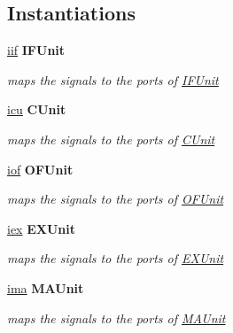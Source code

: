 \subsection*{Instantiations}
 \begin{DoxyCompactItemize}
\item 
\hypertarget{class_simple_r_i_s_c_1_1main_a6915378535caef0a1f9d2cf97dc464b7}{\hyperlink{class_simple_r_i_s_c_1_1main_a6915378535caef0a1f9d2cf97dc464b7}{iif}  {\bfseries I\-F\-Unit}   }\label{class_simple_r_i_s_c_1_1main_a6915378535caef0a1f9d2cf97dc464b7}

\begin{DoxyCompactList}\small\item\em maps the signals to the ports of \hyperlink{class_i_f_unit}{I\-F\-Unit} \end{DoxyCompactList}\item 
\hypertarget{class_simple_r_i_s_c_1_1main_ae66107dcb400a2c22d4d1316a2de3289}{\hyperlink{class_simple_r_i_s_c_1_1main_ae66107dcb400a2c22d4d1316a2de3289}{icu}  {\bfseries C\-Unit}   }\label{class_simple_r_i_s_c_1_1main_ae66107dcb400a2c22d4d1316a2de3289}

\begin{DoxyCompactList}\small\item\em maps the signals to the ports of \hyperlink{class_c_unit}{C\-Unit} \end{DoxyCompactList}\item 
\hypertarget{class_simple_r_i_s_c_1_1main_af2805cb31aa7733a71e2d9b7e59bb510}{\hyperlink{class_simple_r_i_s_c_1_1main_af2805cb31aa7733a71e2d9b7e59bb510}{iof}  {\bfseries O\-F\-Unit}   }\label{class_simple_r_i_s_c_1_1main_af2805cb31aa7733a71e2d9b7e59bb510}

\begin{DoxyCompactList}\small\item\em maps the signals to the ports of \hyperlink{class_o_f_unit}{O\-F\-Unit} \end{DoxyCompactList}\item 
\hypertarget{class_simple_r_i_s_c_1_1main_a03911597d8f737c88f243be080110a60}{\hyperlink{class_simple_r_i_s_c_1_1main_a03911597d8f737c88f243be080110a60}{iex}  {\bfseries E\-X\-Unit}   }\label{class_simple_r_i_s_c_1_1main_a03911597d8f737c88f243be080110a60}

\begin{DoxyCompactList}\small\item\em maps the signals to the ports of \hyperlink{class_e_x_unit}{E\-X\-Unit} \end{DoxyCompactList}\item 
\hypertarget{class_simple_r_i_s_c_1_1main_a35c82dc98430213354cf872354a1ca6b}{\hyperlink{class_simple_r_i_s_c_1_1main_a35c82dc98430213354cf872354a1ca6b}{ima}  {\bfseries M\-A\-Unit}   }\label{class_simple_r_i_s_c_1_1main_a35c82dc98430213354cf872354a1ca6b}

\begin{DoxyCompactList}\small\item\em maps the signals to the ports of \hyperlink{class_m_a_unit}{M\-A\-Unit} \end{DoxyCompactList}\end{DoxyCompactItemize}


